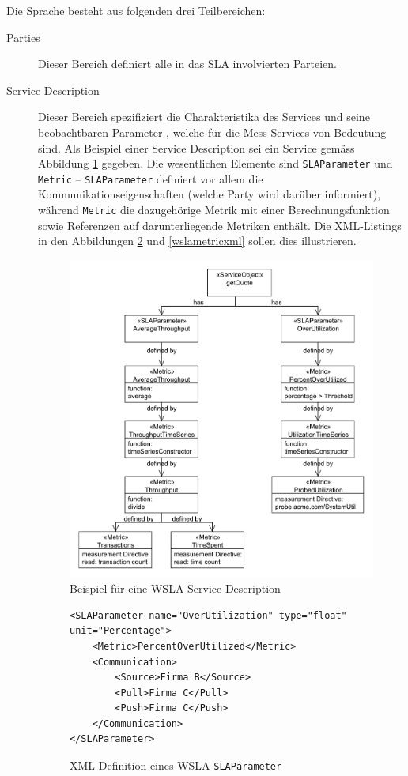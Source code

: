 \documentclass[11pt,listof=totoc]{scrreprt} %
\theoremstyle{definition}
\begin{document}
Die Sprache besteht aus folgenden drei Teilbereichen:
\begin{description}
\item[Parties] Dieser Bereich definiert alle in das SLA involvierten Parteien. 
\item[Service Description] Dieser Bereich spezifiziert die Charakteristika des Services und seine beobachtbaren Parameter \cite{ibm:wslaPaper}, welche für die Mess-Services von Bedeutung sind. Als Beispiel einer Service Description sei ein Service gemäss Abbildung \ref{wsladesc} gegeben. Die wesentlichen Elemente sind {\tt SLAParameter} und {\tt Metric} -- {\tt SLAParameter} definiert vor allem die Kommunikationseigenschaften (welche Party wird darüber informiert), während {\tt Metric} die dazugehörige Metrik mit einer Berechnungsfunktion sowie Referenzen auf darunterliegende Metriken enthält. Die XML-Listings in den Abbildungen \ref{wslaparamxml} und \ref{wslametricxml} sollen dies illustrieren.

\begin{figure}
\caption{Beispiel für eine WSLA-Service Description}
\label{wsladesc}
\includegraphics[scale=0.6]{diagramme/wsla_servicedesc.pdf}
\end{figure}

\begin{figure}
\caption{XML-Definition eines WSLA-{\tt SLAParameter}}
\label{wslaparamxml}
\begin{lstlisting}
<SLAParameter name="OverUtilization" type="float" unit="Percentage">
	<Metric>PercentOverUtilized</Metric>
	<Communication>
		<Source>Firma B</Source>
		<Pull>Firma C</Pull>
		<Push>Firma C</Push>
	</Communication>
</SLAParameter>
\end{lstlisting}
\end{figure}


\end{description}
\end{document}
